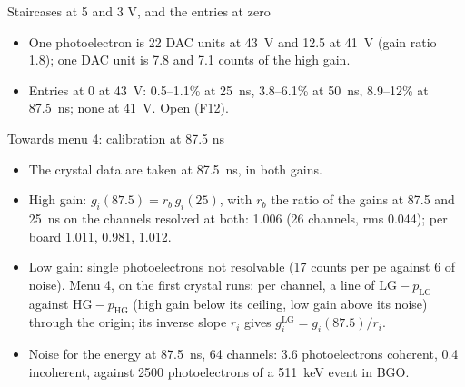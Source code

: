 \begin{frame}{Staircases at 5 and 3 V, and the entries at zero}
\centering
\scriptsize


\medskip


\medskip
\normalsize
\begin{itemize}
\item One photoelectron is 22 DAC units at 43~V and 12.5 at 41~V (gain ratio 1.8); one DAC
  unit is 7.8 and 7.1 counts of the high gain.
\item Entries at 0 at 43~V: 0.5--1.1\% at 25~ns, 3.8--6.1\% at 50~ns, 8.9--12\% at 87.5~ns;
  none at 41~V. Open (F12).
\end{itemize}
\end{frame}

\begin{frame}{Towards menu 4: calibration at 87.5 ns}
\begin{itemize}
\item The crystal data are taken at 87.5~ns, in both gains.
\item High gain: $g_i(87.5) = r_b\, g_i(25)$, with $r_b$ the ratio of the gains at 87.5 and
  25~ns on the channels resolved at both: 1.006 (26 channels, rms 0.044); per board 1.011,
  0.981, 1.012.
\item Low gain: single photoelectrons not resolvable (17 counts per pe against 6 of noise).
  Menu 4, on the first crystal runs: per channel, a line of $\mathrm{LG} - p_\mathrm{LG}$
  against $\mathrm{HG} - p_\mathrm{HG}$ (high gain below its ceiling, low gain above its
  noise) through the origin; its inverse slope $r_i$ gives $g^\mathrm{LG}_i = g_i(87.5)/r_i$.
\item Noise for the energy at 87.5~ns, 64 channels: 3.6 photoelectrons coherent, 0.4
  incoherent, against 2500 photoelectrons of a 511~keV event in BGO.
\end{itemize}
\end{frame}

